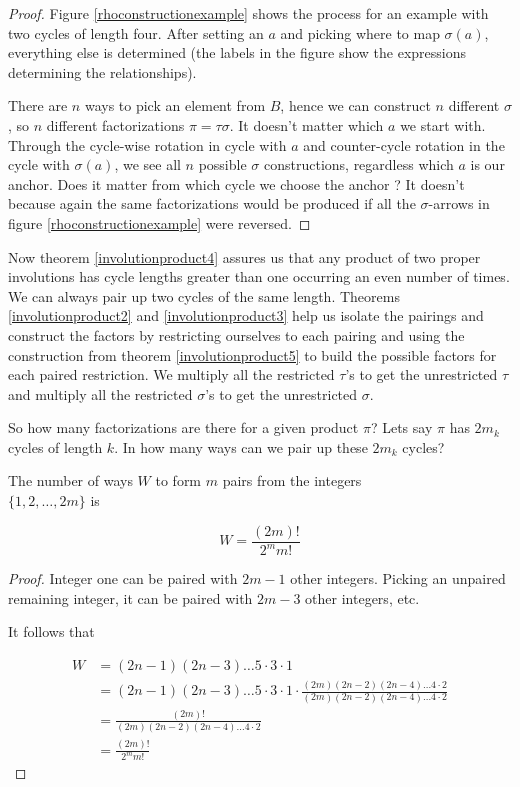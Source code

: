 \begin{proof}
Figure \ref{rhoconstructionexample} shows the process for an example with two cycles of length four. After setting an $a$ and picking where to map $\sigma(a)$, everything else is determined (the labels in the figure show the expressions determining the relationships).

There are $n$ ways to pick an element from $B$, hence we can construct $n$ different $\sigma$, so $n$ different factorizations $\pi = \tau \sigma$. It doesn't matter which $a$ we start with. Through the cycle-wise rotation in cycle with $a$ and counter-cycle rotation in the cycle with $\sigma(a)$, we see all $n$ possible $\sigma$ constructions, regardless which $a$ is our anchor. Does it matter from which cycle we choose the anchor ? It doesn't because again the same factorizations would be produced if all the $\sigma$-arrows in figure \ref{rhoconstructionexample} were reversed.

\end{proof}

Now theorem \ref{involutionproduct4} assures us that any product of two proper involutions has cycle lengths greater than one occurring an even number of times. We can always pair up two cycles of the same length. Theorems \ref{involutionproduct2} and \ref{involutionproduct3} help us isolate the pairings and construct the factors by restricting ourselves to each pairing and using the construction from theorem \ref{involutionproduct5} to build the possible factors for each paired restriction. We multiply all the restricted $\tau$'s to get the unrestricted $\tau$ and multiply all the restricted $\sigma$'s to get the unrestricted $\sigma$.

So how many factorizations are there for a given product $\pi$? Lets say $\pi$ has $2m_k$ cycles of length $k$. In how many ways can we pair up these $2m_k$ cycles? 

\begin{thm}\label{numpairings}
The number of ways $W$ to form $m$ pairs from the integers \\
$\{1, 2, \ldots, 2m\}$ is

$$
W = \frac{(2m)!}{2^m m!}
$$

\end{thm}

\begin{proof}

Integer one can be paired with $2m-1$ other integers. Picking an unpaired remaining integer, it can be paired with $2m-3$ other integers, etc.

It follows that

\begin{align*}
W &= (2n-1)(2n-3) \ldots 5 \cdot 3 \cdot 1 \\
  &= (2n-1)(2n-3) \ldots 5 \cdot 3 \cdot 1 \cdot \frac{(2m)(2n-2)(2n-4) \ldots 4 \cdot 2}{(2m)(2n-2)(2n-4) \ldots 4 \cdot 2} \\
  &= \frac{(2m)!}{(2m)(2n-2)(2n-4) \ldots 4 \cdot 2} \\
  &=\frac{(2m)!}{2^m m!}
\end{align*}

\end{proof}

